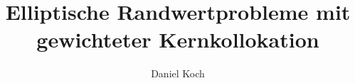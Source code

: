\documentclass[bachelor,german]{hgbthesis}
\title{Elliptische Randwertprobleme mit gewichteter Kernkollokation}
\author{Daniel Koch}
\theoremstyle{plain}
\theoremstyle{definition}
\theoremstyle{definition}
\theoremstyle{remark}
\begin{document}

\frontmatter                    %

\maketitle
\tableofcontents

		
			

\mainmatter          %










\appendix                                            %


\MakeBibliography                        %



\end{document}
